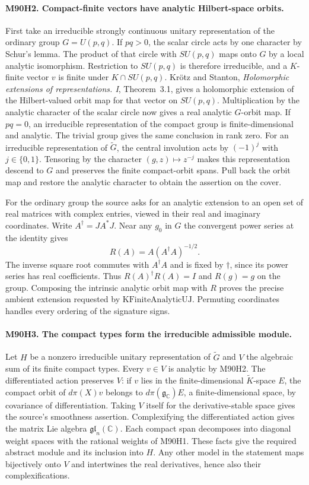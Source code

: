 \paragraph{M90H2. Compact-finite vectors have analytic Hilbert-space orbits.}
First take an irreducible strongly continuous unitary representation
of the ordinary group $G=U(p,q)$. If $pq>0$, the scalar circle acts
by one character by Schur's lemma. The product of that circle with
$SU(p,q)$ maps onto $G$ by a local analytic isomorphism. Restriction
to $SU(p,q)$ is therefore irreducible, and a $K$-finite vector $v$
is finite under $K\cap SU(p,q)$. Kr\"otz and Stanton,
\emph{Holomorphic extensions of representations. I}, Theorem~3.1,
gives a holomorphic extension of the Hilbert-valued orbit map for
that vector on $SU(p,q)$. Multiplication by the analytic character
of the scalar circle now gives a real analytic $G$-orbit map.
If $pq=0$, an irreducible representation of the compact group is
finite-dimensional and analytic. The trivial group gives the same
conclusion in rank zero. For an irreducible representation of
$\widetilde G$, the central involution acts by $(-1)^j$ with
$j\in\{0,1\}$. Tensoring by the character $(g,z)\mapsto z^{-j}$
makes this representation descend to $G$ and preserves the finite
compact-orbit spans. Pull back the orbit map and restore the analytic
character to obtain the assertion on the cover.

For the ordinary group the source asks for an analytic extension to
an open set of real matrices with complex entries, viewed in their
real and imaginary coordinates. Write $A^\dagger=JA^*J$. Near any
$g_0$ in $G$ the convergent power series at the identity gives
\[
 R(A)=A(A^\dagger A)^{-1/2}.
\]
The inverse square root commutes with $A^\dagger A$ and is fixed by
$\dagger$, since its power series has real coefficients. Thus
$R(A)^\dagger R(A)=I$ and $R(g)=g$ on the group. Composing the
intrinsic analytic orbit map with $R$ proves the precise ambient
extension requested by $\mathrm{KFiniteAnalyticUJ}$. Permuting
coordinates handles every ordering of the signature signs.

\paragraph{M90H3. The compact types form the irreducible admissible module.}
Let $H$ be a nonzero irreducible unitary representation of
$\widetilde G$ and $V$ the algebraic sum of its finite compact
types. Every $v\in V$ is analytic by M90H2. The differentiated
action preserves $V$: if $v$ lies in the finite-dimensional
$\widetilde K$-space $E$, the compact orbit of $d\pi(X)v$ belongs
to $d\pi(\mathfrak g_{\mathbb C})E$, a finite-dimensional space,
by covariance of differentiation. Taking $V$ itself for the
derivative-stable space gives the source's smoothness assertion.
Complexifying the differentiated action gives the matrix Lie algebra
$\mathfrak{gl}_n({\mathbb C})$. Each compact span decomposes into
diagonal weight spaces with the rational weights of M90H1. These
facts give the required abstract module and its inclusion into $H$.
Any other model in the statement maps bijectively onto $V$ and
intertwines the real derivatives, hence also their complexifications.

